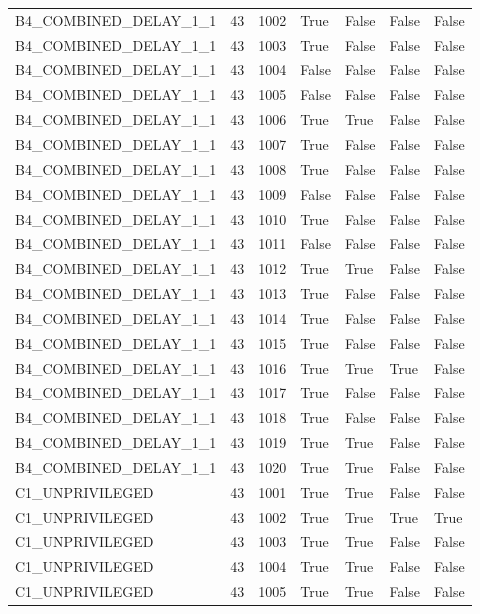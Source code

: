 \documentclass[11pt,a4paper,oneside]{book}
\begin{document}
\begin{longtable}{l l l l l l l}
B4\_COMBINED\_DELAY\_1\_1 & 43 & 1002 & True & False & False & False \\
B4\_COMBINED\_DELAY\_1\_1 & 43 & 1003 & True & False & False & False \\
B4\_COMBINED\_DELAY\_1\_1 & 43 & 1004 & False & False & False & False \\
B4\_COMBINED\_DELAY\_1\_1 & 43 & 1005 & False & False & False & False \\
B4\_COMBINED\_DELAY\_1\_1 & 43 & 1006 & True & True & False & False \\
B4\_COMBINED\_DELAY\_1\_1 & 43 & 1007 & True & False & False & False \\
B4\_COMBINED\_DELAY\_1\_1 & 43 & 1008 & True & False & False & False \\
B4\_COMBINED\_DELAY\_1\_1 & 43 & 1009 & False & False & False & False \\
B4\_COMBINED\_DELAY\_1\_1 & 43 & 1010 & True & False & False & False \\
B4\_COMBINED\_DELAY\_1\_1 & 43 & 1011 & False & False & False & False \\
B4\_COMBINED\_DELAY\_1\_1 & 43 & 1012 & True & True & False & False \\
B4\_COMBINED\_DELAY\_1\_1 & 43 & 1013 & True & False & False & False \\
B4\_COMBINED\_DELAY\_1\_1 & 43 & 1014 & True & False & False & False \\
B4\_COMBINED\_DELAY\_1\_1 & 43 & 1015 & True & False & False & False \\
B4\_COMBINED\_DELAY\_1\_1 & 43 & 1016 & True & True & True & False \\
B4\_COMBINED\_DELAY\_1\_1 & 43 & 1017 & True & False & False & False \\
B4\_COMBINED\_DELAY\_1\_1 & 43 & 1018 & True & False & False & False \\
B4\_COMBINED\_DELAY\_1\_1 & 43 & 1019 & True & True & False & False \\
B4\_COMBINED\_DELAY\_1\_1 & 43 & 1020 & True & True & False & False \\
C1\_UNPRIVILEGED & 43 & 1001 & True & True & False & False \\
C1\_UNPRIVILEGED & 43 & 1002 & True & True & True & True \\
C1\_UNPRIVILEGED & 43 & 1003 & True & True & False & False \\
C1\_UNPRIVILEGED & 43 & 1004 & True & True & False & False \\
C1\_UNPRIVILEGED & 43 & 1005 & True & True & False & False \\

\end{longtable}
\end{document}
